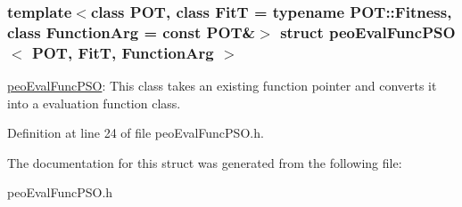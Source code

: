 \subsubsection*{template$<$class POT, class Fit\-T = typename POT::Fitness, class Function\-Arg = const POT\&$>$ struct peo\-Eval\-Func\-PSO$<$ POT, Fit\-T, Function\-Arg $>$}

\hyperlink{structpeoEvalFuncPSO}{peo\-Eval\-Func\-PSO}: This class takes an existing function pointer and converts it into a evaluation function class. 



Definition at line 24 of file peo\-Eval\-Func\-PSO.h.

The documentation for this struct was generated from the following file:\begin{CompactItemize}
\item 
peo\-Eval\-Func\-PSO.h\end{CompactItemize}
